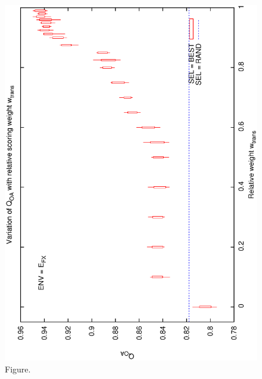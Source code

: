 \documentclass[12pt,a4paper]{article}
\begin{document}
\begin{figure}[htbp]
 \begin{center}
  \includegraphics[scale=1.0, angle=0]{figures/cs1_dw2_oa.eps}
 \end{center}
  \caption[Figure.]
{Figure.}
\end{figure}
\clearpage
\end{document}
